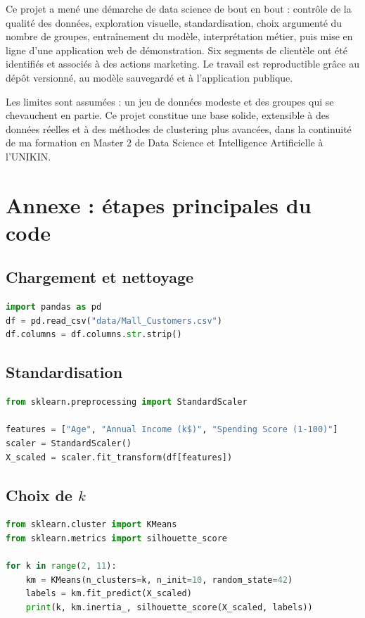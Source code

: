 \documentclass[11pt,a4paper]{article}
\begin{document}
Ce projet a mené une démarche de data science de bout en bout : contrôle de la qualité des données, exploration visuelle, standardisation, choix argumenté du nombre de groupes, entraînement du modèle, interprétation métier, puis mise en ligne d'une application web de démonstration. Six segments de clientèle ont été identifiés et associés à des actions marketing. Le travail est reproductible grâce au dépôt versionné, au modèle sauvegardé et à l'application publique.

Les limites sont assumées : un jeu de données modeste et des groupes qui se chevauchent en partie. Ce projet constitue une base solide, extensible à des données réelles et à des méthodes de clustering plus avancées, dans la continuité de ma formation en Master 2 de Data Science et Intelligence Artificielle à l'UNIKIN.

\appendix
\section{Annexe : étapes principales du code}

\subsection{Chargement et nettoyage}
\begin{lstlisting}[language=Python]
import pandas as pd
df = pd.read_csv("data/Mall_Customers.csv")
df.columns = df.columns.str.strip()
\end{lstlisting}

\subsection{Standardisation}
\begin{lstlisting}[language=Python]
from sklearn.preprocessing import StandardScaler

features = ["Age", "Annual Income (k$)", "Spending Score (1-100)"]
scaler = StandardScaler()
X_scaled = scaler.fit_transform(df[features])
\end{lstlisting}

\subsection{Choix de $k$}
\begin{lstlisting}[language=Python]
from sklearn.cluster import KMeans
from sklearn.metrics import silhouette_score

for k in range(2, 11):
    km = KMeans(n_clusters=k, n_init=10, random_state=42)
    labels = km.fit_predict(X_scaled)
    print(k, km.inertia_, silhouette_score(X_scaled, labels))
\end{lstlisting}
\end{document}
